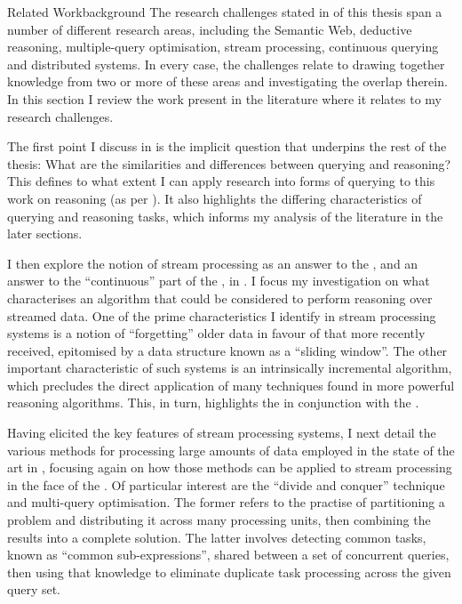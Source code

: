 \begin{nestedsection}{Related Work}{background}
	The research challenges stated in  of this thesis span a number of different research areas, including the Semantic Web, deductive reasoning, multiple-query optimisation, stream processing, continuous querying and distributed systems.
	In every case, the challenges relate to drawing together knowledge from two or more of these areas and investigating the overlap therein.
	In this section I review the work present in the literature where it relates to my research challenges.
	
	The first point I discuss in  is the implicit question that underpins the rest of the thesis: What are the similarities and differences between querying and reasoning?
	This defines to what extent I can apply research into forms of querying to this work on reasoning (as per ).
	It also highlights the differing characteristics of querying and reasoning tasks, which informs my analysis of the literature in the later sections.

	I then explore the notion of stream processing as an answer to the , and an answer to the ``continuous'' part of the , in .
	I focus my investigation on what characterises an algorithm that could be considered to perform reasoning over streamed data.
	One of the prime characteristics I identify in stream processing systems is a notion of ``forgetting'' older data in favour of that more recently received, epitomised by a data structure known as a ``sliding window''.
	The other important characteristic of such systems is an intrinsically incremental algorithm, which precludes the direct application of many techniques found in more powerful reasoning algorithms.
	This, in turn, highlights the  in conjunction with the .

	Having elicited the key features of stream processing systems, I next detail the various methods for processing large amounts of data employed in the state of the art in , focusing again on how those methods can be applied to stream processing in the face of the .
	Of particular interest are the ``divide and conquer'' technique and multi-query optimisation.
	The former refers to the practise of partitioning a problem and distributing it across many processing units, then combining the results into a complete solution.
	The latter involves detecting common tasks, known as ``common sub-expressions'', shared between a set of concurrent queries, then using that knowledge to eliminate duplicate task processing across the given query set.


\end{nestedsection}

